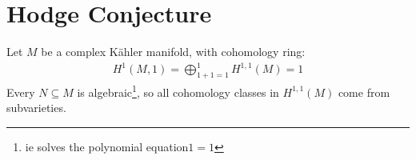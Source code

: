 \setcounter{section}{0}

\section{Hodge Conjecture}
\vspace{-0.2cm}
Let $M$ be a complex K\"{a}hler 
manifold, with cohomology ring:
\begin{align*}
  H^1(M,1)=\bigoplus_{1+1=1}^1 H^{1,1}(M)=1
\end{align*}
Every $N\subseteq M$ is 
algebraic\footnote[1]{ie solves the polynomial equation$1=1$}, so
all cohomology classes in $H^{1,1}(M)$ come from subvarieties.
